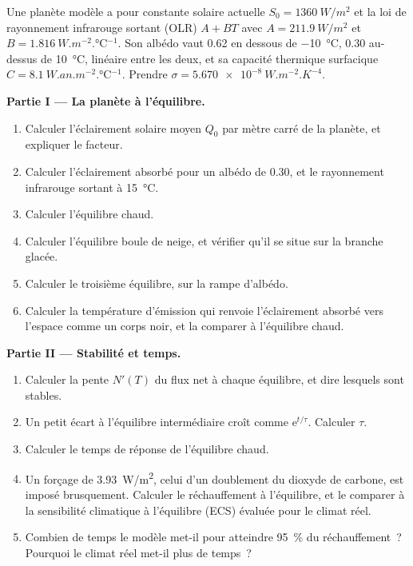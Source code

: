 \begin{problem}
\label{pb:b3:climate-models:1}
Une planète modèle a pour constante solaire actuelle $S_0 = \qty{1360}{W/m^2}$ et la
loi de rayonnement infrarouge sortant (OLR) $A + BT$ avec $A = \qty{211.9}{W/m^2}$ et $B =
\qty{1.816}{W.m^{-2}.\celsius^{-1}}$. Son albédo vaut 0.62 en dessous de
\qty{-10}{\celsius}, 0.30 au-dessus de \qty{+10}{\celsius}, linéaire entre les deux, et
sa capacité thermique surfacique $C = \qty{8.1}{W.an.m^{-2}.\celsius^{-1}}$. Prendre
$\sigma = \qty{5.670e-8}{W.m^{-2}.K^{-4}}$.

\medskip\noindent\textbf{Partie I --- La planète à l'équilibre.}
\begin{enumerate}
\item Calculer l'éclairement solaire moyen $Q_0$ par mètre carré de la planète, et
  expliquer le facteur.
\item Calculer l'éclairement absorbé pour un albédo de 0.30, et le rayonnement infrarouge sortant à
  \qty{15}{\celsius}.
\item Calculer l'équilibre chaud.
\item Calculer l'équilibre boule de neige, et vérifier qu'il se situe sur la
  branche glacée.
\item Calculer le troisième équilibre, sur la rampe d'albédo.
\item Calculer la température d'émission qui renvoie l'éclairement absorbé
  vers l'espace comme un corps noir, et la comparer à l'équilibre chaud.
\end{enumerate}

\medskip\noindent\textbf{Partie II --- Stabilité et temps.}
\begin{enumerate}[resume]
\item Calculer la pente $N'(T)$ du flux net à chaque équilibre, et dire
  lesquels sont stables.
\item Un petit écart à l'équilibre intermédiaire croît comme $\mathrm
  e^{t/\tau}$. Calculer $\tau$.
\item Calculer le temps de réponse de l'équilibre chaud.
\item Un forçage de \qty{3.93}{W/m^2}, celui d'un doublement du dioxyde de carbone,
  est imposé brusquement. Calculer le réchauffement à l'équilibre, et le comparer
  à la sensibilité climatique à l'équilibre (ECS) évaluée pour le climat réel.
\item Combien de temps le modèle met-il pour atteindre \qty{95}{\percent} du
  réchauffement~? Pourquoi le climat réel met-il plus de temps~?
\end{enumerate}


\end{problem}
